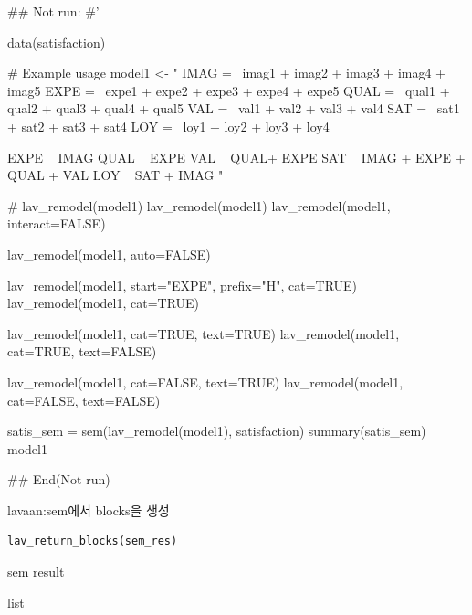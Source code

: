 \documentclass[a4paper]{book}
\begin{document}
\begin{Examples}
\begin{ExampleCode}

## Not run: 
#'


data(satisfaction)

# Example usage
model1 <- "
IMAG =~ imag1 + imag2 + imag3 + imag4 + imag5
EXPE =~ expe1 + expe2 + expe3 + expe4 + expe5
QUAL =~ qual1 + qual2 + qual3 + qual4 + qual5
VAL =~ val1 + val2 + val3 + val4
SAT =~ sat1 + sat2 + sat3 + sat4
LOY =~ loy1 + loy2 + loy3 + loy4

EXPE ~ IMAG
QUAL ~ EXPE
VAL ~  QUAL+ EXPE
SAT ~ IMAG + EXPE + QUAL + VAL
LOY ~ SAT + IMAG
"



# lav_remodel(model1)
lav_remodel(model1)%
lav_remodel(model1, interact=FALSE)%

lav_remodel(model1, auto=FALSE)%

lav_remodel(model1, start="EXPE", prefix="H", cat=TRUE)
lav_remodel(model1, cat=TRUE)

lav_remodel(model1, cat=TRUE, text=TRUE)
lav_remodel(model1, cat=TRUE, text=FALSE)

lav_remodel(model1, cat=FALSE, text=TRUE)
lav_remodel(model1, cat=FALSE, text=FALSE)


satis_sem = sem(lav_remodel(model1), satisfaction)
summary(satis_sem)
model1 %



## End(Not run)


\end{ExampleCode}
\end{Examples}
%
\begin{Description}
lavaan:sem에서 blocks을 생성
\end{Description}
%
\begin{Usage}
\begin{verbatim}
lav_return_blocks(sem_res)
\end{verbatim}
\end{Usage}
%
\begin{Arguments}
\begin{ldescription}
\item[\code{sem\_res}] sem result
\end{ldescription}
\end{Arguments}
%
\begin{Value}
list
\end{Value}
\end{document}
